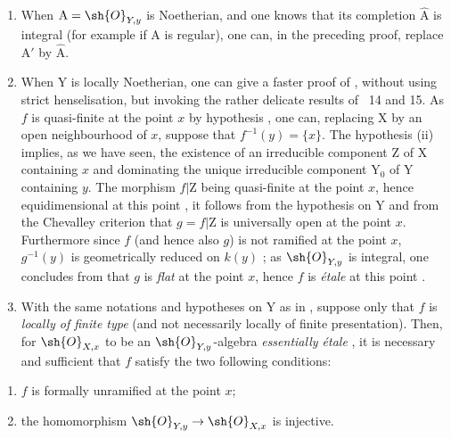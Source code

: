 \begin{remark}[18.10.2]
\label{IV.18.10.2}
\medskip\noindent
\begin{enumerate}[label=(\roman*)]
  \item When $\mathrm{A}=\sh{O}_{Y,y}$ is Noetherian, and one knows that its completion $\hat{\mathrm{A}}$ is integral (for example if $\mathrm{A}$ is regular), one can, in the preceding proof, replace $\mathrm{A}'$ by $\hat{\mathrm{A}}$.
  \item When $\mathrm{Y}$ is locally Noetherian, one can give a faster proof of , without using strict henselisation, but invoking the rather delicate results of \textsection\textsection~14 and 15.
As $f$ is quasi-finite at the point $x$ by hypothesis , one can, replacing $\mathrm{X}$ by an open neighbourhood of $x$, suppose that $f^{-1}(y)=\{x\}$.
The hypothesis (ii) implies, as we have seen, the existence of an irreducible component $\mathrm{Z}$ of $\mathrm{X}$ containing $x$ and dominating the unique irreducible component $\mathrm{Y}_0$ of $\mathrm{Y}$ containing $y$.
The morphism $f|\mathrm{Z}$ being quasi-finite at the point $x$, hence equidimensional at this point , it follows from the hypothesis on $\mathrm{Y}$ and from the Chevalley criterion  that $g=f|\mathrm{Z}$ is universally open at the point $x$.
Furthermore since $f$ (and hence also $g$) is not ramified at the point $x$, $g^{-1}(y)$ is geometrically reduced on $k(y)$ ; as $\sh{O}_{Y,y}$ is integral, one concludes from  that $g$ is \emph{flat} at the point $x$, hence $f$ is \emph{\'etale} at this point .
  \item With the same notations and hypotheses on $\mathrm{Y}$ as in , suppose only that $f$ is \emph{locally of finite type} (and not necessarily locally of finite presentation).
Then, for $\sh{O}_{X,x}$ to be an $\sh{O}_{Y,y}$-algebra \emph{essentially \'etale} , it is necessary and sufficient that $f$ satisfy the two following conditions:
\end{enumerate}
\end{remark}

\begin{enumerate}[label=\arabic*\textsuperscript{o}]
  \item $f$ is formally unramified at the point $x$;
  \item the homomorphism $\sh{O}_{Y,y}\to\sh{O}_{X,x}$ is injective.
\end{enumerate}

